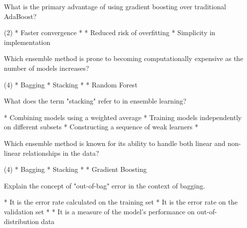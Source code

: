 \documentclass[10pt]{extarticle}
\begin{document}
\begin{exercise}
    What is the primary advantage of using gradient boosting over traditional AdaBoost?
    \begin{choice} (2)
        * Faster convergence
        * 
        * Reduced risk of overfitting
        * Simplicity in implementation
    \end{choice}
\end{exercise}
\begin{solution}
\end{solution}

\begin{exercise}
    Which ensemble method is prone to becoming computationally expensive as the number of models increases?
    \begin{choice} (4)
        * Bagging
        * Stacking
        * 
        * Random Forest
    \end{choice}
\end{exercise}
\begin{solution}
\end{solution}

\begin{exercise}
    What does the term "stacking" refer to in ensemble learning?
    \begin{choice}
        * Combining models using a weighted average
        * Training models independently on different subsets
        * Constructing a sequence of weak learners
        * 
    \end{choice}
\end{exercise}
\begin{solution}
\end{solution}

\begin{exercise}
    Which ensemble method is known for its ability to handle both linear and non-linear relationships in the data?
    \begin{choice}(4)
        * Bagging
        * Stacking
        * 
        * Gradient Boosting
    \end{choice}
\end{exercise}
\begin{solution}
\end{solution}

\begin{exercise}
    Explain the concept of "out-of-bag" error in the context of bagging.
    \begin{choice}
        * It is the error rate calculated on the training set
        * It is the error rate on the validation set
        * 
        * It is a measure of the model's performance on out-of-distribution data
    \end{choice}
\end{exercise}
\begin{solution}
\end{solution}
\end{document}
